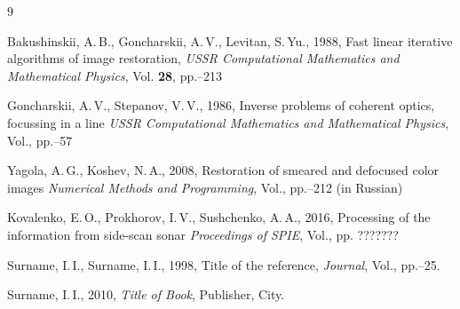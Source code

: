 \documentclass{procDDs}
\begin{document}
\begin {thebibliography}{9}

 Bakushinskii, A.\,B., Goncharskii, A.\,V., Levitan, S.\,Yu., 1988, 
			Fast linear iterative algorithms of image restoration, 
			\emph{USSR Computational Mathematics and Mathematical Physics},
			Vol.\; {\bf 28}, pp.\; 210--213
			
  Goncharskii, A.\,V., Stepanov, V.\,V., 1986,
			Inverse problems of coherent optics, focussing in a line
			\emph{USSR Computational Mathematics and Mathematical Physics},
			Vol., pp.--57
			
 Yagola, A.\,G., Koshev, N.\,A., 2008,
			Restoration of smeared and defocused color images
			\emph{Numerical Methods and Programming},
			Vol., pp.–212 (in Russian)
			
 Kovalenko, E.\,O., Prokhorov, I.\,V., Sushchenko, A.\,A., 2016,
			Processing of the information from side-scan sonar
			\emph{Proceedings of SPIE},
			Vol., pp.\; ???????

 Surname, I.\,I., Surname, I.\,I., 1998,
            Title of the reference,
            \emph{Journal}, Vol., pp.--25.

 Surname, I.\,I., 2010, \textit{Title of Book}, Publisher, City.

\end{thebibliography}
\end{document}
